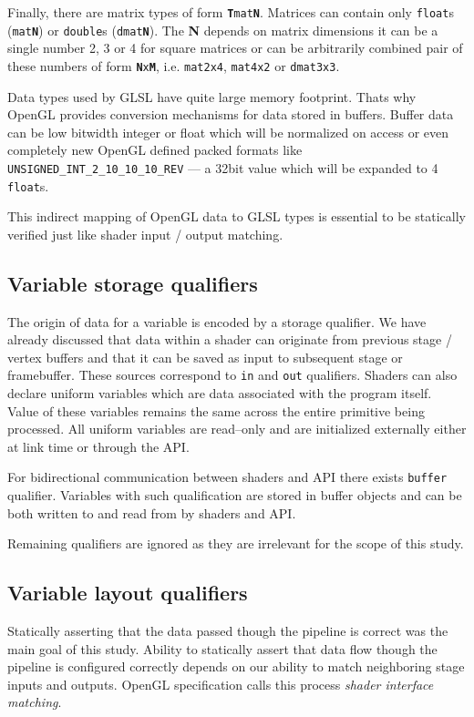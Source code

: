 Finally, there are matrix types of form \texttt{\textbf{T}mat\textbf{N}}. Matrices can contain only \texttt{float}s (\texttt{mat\textbf{N}}) or \texttt{double}s (\texttt{dmat\textbf{N}}).
The \textbf{N} depends on matrix dimensions it can be a single number 2, 3 or 4 for square matrices or can be arbitrarily combined pair of these numbers of form \texttt{\textbf{N}x\textbf{M}},
i.e. \texttt{mat2x4}, \texttt{mat4x2} or \texttt{dmat3x3}.

Data types used by GLSL have quite large memory footprint. Thats why OpenGL provides conversion mechanisms for data stored in buffers. Buffer data can be low bitwidth integer or float which will be normalized on access or even completely 
new OpenGL defined packed formats like \texttt{UNSIGNED\_INT\_2\_10\_10\_10\_REV} --- a 32bit value which will be expanded to 4 \texttt{float}s. 

This indirect mapping of OpenGL data to GLSL types is essential to be statically verified just like shader input / output matching.

\subsection{Variable storage qualifiers}

The origin of data for a variable is encoded by a storage qualifier. We have already discussed that data within a shader can originate from previous stage / vertex buffers and that it can be saved as input to subsequent stage or framebuffer.
These sources correspond to \texttt{in} and \texttt{out} qualifiers. 
Shaders can also declare uniform variables which are data associated with the program itself. Value of these variables remains the same across the
entire primitive being processed. All uniform variables are read--only and are initialized externally either at link time or through the API.

For bidirectional communication between shaders and API there exists \texttt{buffer} qualifier. Variables with such qualification are stored in buffer objects and can be both written to and read from by shaders and API.

Remaining qualifiers are ignored as they are irrelevant for the scope of this study.

\subsection{Variable layout qualifiers}

Statically asserting that the data passed though the pipeline is correct was the main goal of this study.
Ability to statically assert that data flow though the pipeline is configured correctly depends on our ability to match neighboring stage inputs and outputs.
OpenGL specification calls this process \textit{shader interface matching}.

